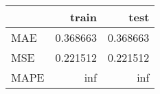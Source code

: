 \begin{tabular}{lrr}
\toprule
{} &     train &      test \\
\midrule
MAE  &  0.368663 &  0.368663 \\
MSE  &  0.221512 &  0.221512 \\
MAPE &       inf &       inf \\
\bottomrule
\end{tabular}
